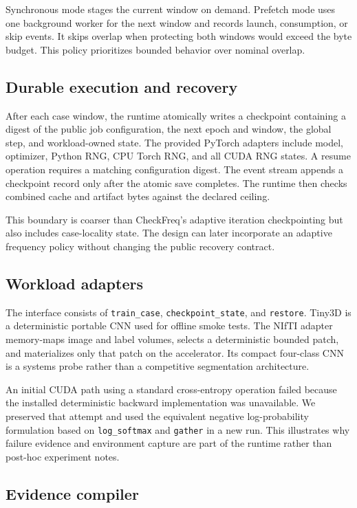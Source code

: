 \documentclass[10pt,twocolumn]{article}
\begin{document}
Synchronous mode stages the current window on demand. Prefetch mode uses one
background worker for the next window and records launch, consumption, or skip
events. It skips overlap when protecting both windows would exceed the byte
budget. This policy prioritizes bounded behavior over nominal overlap.

\subsection{Durable execution and recovery}

After each case window, the runtime atomically writes a checkpoint containing a
digest of the public job configuration, the next epoch and window, the global
step, and workload-owned state. The provided PyTorch adapters include model,
optimizer, Python RNG, CPU Torch RNG, and all CUDA RNG states. A resume operation
requires a matching configuration digest. The event stream appends a checkpoint
record only after the atomic save completes. The runtime then checks combined
cache and artifact bytes against the declared ceiling.

This boundary is coarser than CheckFreq's adaptive iteration checkpointing but
also includes case-locality state. The design can later incorporate an adaptive
frequency policy without changing the public recovery contract.

\subsection{Workload adapters}

The interface consists of \texttt{train\_case}, \texttt{checkpoint\_state}, and
\texttt{restore}. Tiny3D is a deterministic portable CNN used for offline smoke
tests. The NIfTI adapter memory-maps image and label volumes, selects a
deterministic bounded patch, and materializes only that patch on the accelerator.
Its compact four-class CNN is a systems probe rather than a competitive
segmentation architecture.

An initial CUDA path using a standard cross-entropy operation failed because
the installed deterministic backward implementation was unavailable. We
preserved that attempt and used the equivalent negative log-probability
formulation based on \texttt{log\_softmax} and \texttt{gather} in a new run.
This illustrates why failure evidence and environment capture are part of the
runtime rather than post-hoc experiment notes.

\subsection{Evidence compiler}
\end{document}
